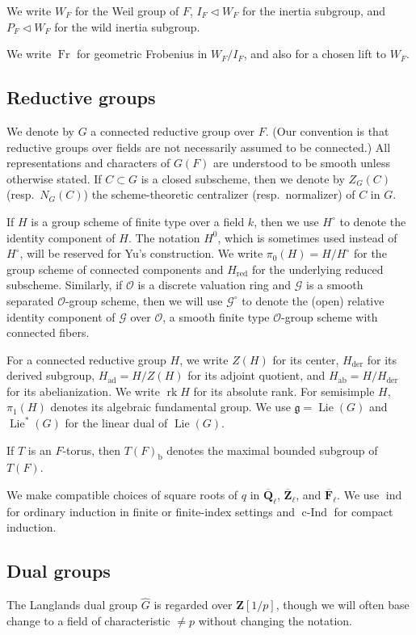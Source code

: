 \documentclass[reqno]{amsart}
\numberwithin{equation}{subsection}
\newcommand{\F}{\mathbf{F}}
\newcommand{\Q}{\mathbf{Q}}
\newcommand{\Z}{\mathbf{Z}}
\newcommand{\ol}[1]{\overline{#1}}
\newcommand{\wh}[1]{\widehat{#1}}
\newcommand\cG{\mathcal{G}}
\newcommand\cO{\mathcal{O}}
\newcommand\frg{\mathfrak{g}}
\DeclareMathOperator{\ab}{ab}
\DeclareMathOperator{\Lie}{Lie}
\DeclareMathOperator{\ad}{ad}
\DeclareMathOperator{\ind}{ind}
\DeclareMathOperator{\cInd}{c-Ind}
\DeclareMathOperator{\red}{red}
\DeclareMathOperator{\der}{der}
\DeclareMathOperator{\rk}{rk}
\DeclareMathOperator{\Fr}{Fr}
\theoremstyle{remark}
\numberwithin{equation}{subsection}
\numberwithin{figure}{subsection}
\begin{document}
We write $W_F$ for the Weil group of $F$, $I_F \triangleleft W_F$ for the inertia subgroup, and $P_F \triangleleft W_F$ for the wild inertia subgroup. 

We write $\Fr$ for geometric Frobenius in $W_F/I_F$, and also for a chosen lift to $W_F$.



\subsection{Reductive groups}
We denote by $G$ a connected reductive group over $F$. (Our convention is that reductive groups over fields are not necessarily assumed to be connected.) All representations and characters of $G(F)$ are understood to be smooth unless otherwise stated. If $C \subset G$ is a closed subscheme, then we denote by $Z_G(C)$ (resp.\ $N_G(C)$) the scheme-theoretic centralizer (resp.\ normalizer) of $C$ in $G$.

If $H$ is a group scheme of finite type over a field $k$, then we use $H^\circ$ to denote the identity component of $H$. The notation $H^0$, which is sometimes used instead of $H^\circ$, will be reserved for Yu's construction. We write $\pi_0(H)=H/H^\circ$ for the group scheme of connected components and $H_{\red}$ for the underlying reduced subscheme. Similarly, if $\cO$ is a discrete valuation ring and $\cG$ is a smooth separated $\cO$-group scheme, then we will use $\cG^\circ$ to denote the (open) relative identity component of $\cG$ over $\cO$, a smooth finite type $\cO$-group scheme with connected fibers.


For a connected reductive group $H$, we write $Z(H)$ for its center, $H_{\der}$ for its derived subgroup, $H_{\ad}=H/Z(H)$ for its adjoint quotient, and $H_{\ab}=H/H_{\der}$ for its abelianization. We write $\rk H$ for its absolute rank. For semisimple $H$, $\pi_1(H)$ denotes its algebraic fundamental group. We use $\frg=\Lie(G)$ and $\Lie^*(G)$ for the linear dual of $\Lie(G)$.

If $T$ is an $F$-torus, then $T(F)_{\mathrm{b}}$ denotes the maximal bounded subgroup of $T(F)$.

We make compatible choices of square roots of $q$ in $\ol\Q_\ell$, $\ol\Z_\ell$, and $\ol\F_\ell$. We use $\ind$ for ordinary induction in finite or finite-index settings and $\cInd$ for compact induction.


\subsection{Dual groups}
The Langlands dual group $\wh{G}$ is regarded over $\Z[1/p]$, though we will often base change to a field of characteristic $\neq p$ without changing the notation. 
\end{document}
